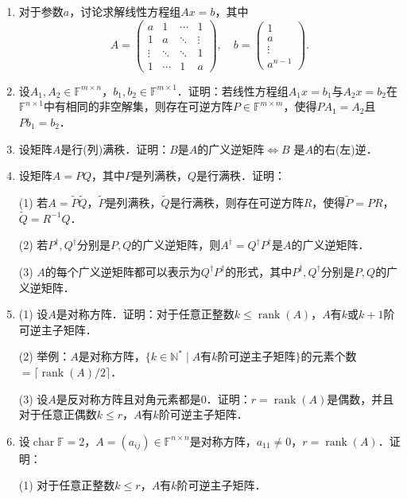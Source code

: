 \documentclass[a4paper,fontset=windows]{ctexbook}
\theoremstyle{definition}
\DeclareMathOperator{\Char}{char}
\DeclareMathOperator{\rank}{rank}
\renewcommand{\le}{\leqslant}
\begin{document}
\begin{enumerate}
\item 对于参数$a$，讨论求解线性方程组$Ax=b$，其中
$$A=\begin{pmatrix}a&1&\cdots&1 \\ 1&a&\ddots&\vdots \\ \vdots&\ddots&\ddots&1 \\ 1&\cdots&1&a\end{pmatrix},\quad b=\begin{pmatrix}1 \\ a \\ \vdots \\ a^{n-1}\end{pmatrix}.$$

\item 设$A_1,A_2\in\mathbb{F}^{m\times n}$，$b_1,b_2\in\mathbb{F}^{m\times 1}$．证明：若线性方程组$A_1x=b_1$与$A_2x=b_2$在$\mathbb{F}^{n\times 1}$中有相同的非空解集，则存在可逆方阵$P\in\mathbb{F}^{m\times m}$，使得$PA_1=A_2$且$Pb_1=b_2$．

\item 设矩阵$A$是行(列)满秩．证明：$B$是$A$的广义逆矩阵$\Leftrightarrow B$ 是$A$的右(左)逆．

\item 设矩阵$A=PQ$，其中$P$是列满秩，$Q$是行满秩．证明：

(1) 若$A=\widetilde{P}\widetilde{Q}$，$\widetilde{P}$是列满秩，$\widetilde{Q}$是行满秩，则存在可逆方阵$R$，使得$\widetilde{P}=PR$，$\widetilde{Q}=R^{-1}Q$．

(2) 若$P^\dagger,Q^\dagger$分别是$P,Q$的广义逆矩阵，则$A^\dagger=Q^\dagger P^\dagger$是$A$的广义逆矩阵．

(3) $A$的每个广义逆矩阵都可以表示为$Q^\dagger P^\dagger$的形式，其中$P^\dagger,Q^\dagger$分别是$P,Q$的广义逆矩阵．

\item (1) 设$A$是对称方阵．证明：对于任意正整数$k\le\rank(A)$，$A$有$k$或$k+1$阶可逆主子矩阵．

(2) 举例：$A$是对称方阵，$\{k\in\mathbb{N}^*\mid\text{$A$有$k$阶可逆主子矩阵}\}$的元素个数$=\lceil\rank(A)/2\rceil$．

(3) 设$A$是反对称方阵且对角元素都是0．证明：$r=\rank(A)$是偶数，并且对于任意正偶数$k\le r$，$A$有$k$阶可逆主子矩阵．

\item 设$\Char\mathbb{F}=2$，$A=(a_{ij})\in\mathbb{F}^{n\times n}$是对称方阵，$a_{11}\ne 0$，$r=\rank(A)$．证明：

(1) 对于任意正整数$k\le r$，$A$有$k$阶可逆主子矩阵．


\end{enumerate}
\end{document}
